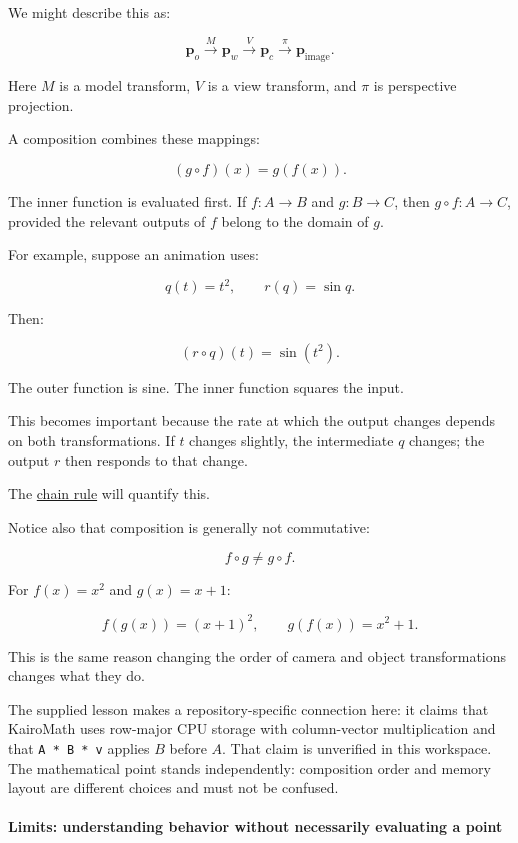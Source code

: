 We might describe this as:

\[
\mathbf p_o \xrightarrow{M} \mathbf p_w \xrightarrow{V} \mathbf p_c \xrightarrow{\pi} \mathbf p_{\text{image}}.
\]

Here \(M\) is a model transform, \(V\) is a view transform, and \(\pi\) is perspective projection.

A composition combines these mappings:

\[
(g\circ f)(x)=g(f(x)).
\]

The inner function is evaluated first. If \(f:A\to B\) and \(g:B\to C\), then \(g\circ f:A\to C\), provided the relevant outputs of \(f\) belong to the domain of \(g\).

For example, suppose an animation uses:

\[
q(t)=t^2,\qquad r(q)=\sin q.
\]

Then:

\[
(r\circ q)(t)=\sin(t^2).
\]

The outer function is sine. The inner function squares the input.

This becomes important because the rate at which the output changes depends on both transformations. If \(t\) changes slightly, the intermediate \(q\) changes; the output \(r\) then responds to that change.

The \hyperref[01-foundations-i-ch020-functions-limits-continuity-and-scalar-change]{chain rule} will quantify this.

Notice also that composition is generally not commutative:

\[
f\circ g\ne g\circ f.
\]

For \(f(x)=x^2\) and \(g(x)=x+1\):

\[
f(g(x))=(x+1)^2, \qquad g(f(x))=x^2+1.
\]

This is the same reason changing the order of camera and object transformations changes what they do.

The supplied lesson makes a repository-specific connection here: it claims that KairoMath uses row-major CPU storage with column-vector multiplication and that \texttt{A\ *\ B\ *\ v} applies \(B\) before \(A\). That claim is unverified in this workspace. The mathematical point stands independently: composition order and memory layout are different choices and must not be confused.

\paragraph{Limits: understanding behavior without necessarily evaluating a point}\label{01-foundations-i-ch020-limits-understanding-behavior-without-necessarily-evaluating-a-point}

